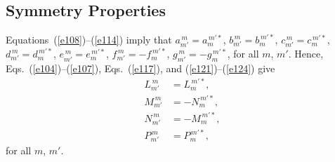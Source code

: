 \documentclass[12pt,prb,aps]{revtex4-1}
\begin{document}
\subsection{Symmetry Properties}
Equations~(\ref{e108})--(\ref{e114}) imply that
$a_{m'}^{\,m}= a_m^{\,m'\ast}$,
$b_{m'}^{\,m}= b_m^{\,m'\ast}$, 
$c_{m'}^{\,m}= c_m^{\,m'\ast}$,
$d_{m'}^{\,m}= d_m^{\,m'\ast}$,
$e_{m'}^{\,m}= e_m^{\,m'\ast}$,
$f_{m'}^{\,m}= -f_m^{\,m'\ast}$,
$g_{m'}^{\,m}= -g_m^{\,m'\ast}$,
for all $m$, $m'$.
 Hence, Eqs.~(\ref{e104})--(\ref{e107}), Eqs.~(\ref{e117}), and (\ref{e121})--(\ref{e124}) give
\begin{align}
L_{m'}^{\,m}&= L_m^{\,m'\ast},\label{e137}\\[0.5ex]
M_{m'}^{\,m}&=-N_m^{\,m'\ast},\\[0.5ex]
N_{m'}^{\,m}&=-M_m^{\,m'\ast},\label{e139}\\[0.5ex]
P_{m'}^{\,m}&= P_m^{\,m'\ast},\label{e140}
\end{align}
for all $m$, $m'$. 
\end{document}
